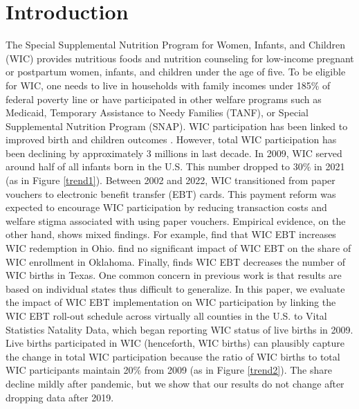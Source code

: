\section{Introduction}
The Special Supplemental Nutrition Program for Women, Infants, and Children
(WIC) provides nutritious foods and nutrition counseling for low-income pregnant or postpartum women, infants, and children under the age of five. To be eligible for WIC, one needs to live in households with family incomes under 185\% of federal poverty line or have participated in other welfare programs such as Medicaid, Temporary Assistance to Needy Families (TANF), or Special Supplemental Nutrition Program (SNAP).  WIC participation has been linked to improved birth and children outcomes \citep{hoynes2011can,kreider2016identifying,chorniy2020does}. However, total WIC participation has been declining by approximately 3 millions in last decade. In 2009, WIC served around half of all infants born in the U.S. This number dropped to 30\% in 2021 (as in Figure \ref{trend1}). Between 2002 and 2022, WIC transitioned from paper vouchers to electronic benefit transfer (EBT) cards. This payment reform was expected to encourage WIC participation by reducing transaction costs and welfare stigma associated with using paper vouchers. Empirical evidence, on the other hand, shows mixed findings. For example, \cite{hanks2019paper} find that WIC EBT increases WIC
redemption in Ohio. \cite{li2022impacts} find no significant impact of WIC EBT on the share of WIC enrollment in Oklahoma. Finally, \cite{meckel2020cure} finds WIC EBT decreases the number of WIC births in Texas. One common concern in previous work is that results are based on individual states thus difficult to generalize. In this paper, we evaluate the impact of WIC EBT implementation on WIC participation by linking the WIC EBT roll-out schedule across virtually all counties in the U.S. to Vital Statistics Natality Data, which began reporting WIC status of live births in 2009. Live births participated in WIC (henceforth, WIC births) can plausibly capture the change in total WIC participation because the ratio of WIC births to total WIC participants maintain 20\% from 2009 (as in Figure \ref{trend2}). The share decline mildly after pandemic, but we show that our results do not change after dropping data after 2019.

